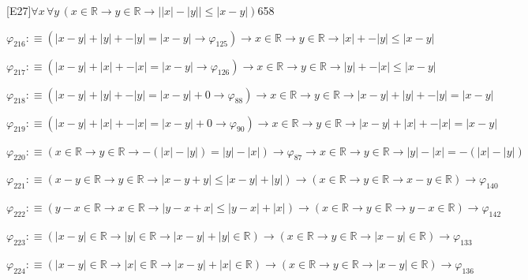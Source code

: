 \begin{fullproof}{[E27]}{$\forall x\,\forall y\,(x \in \mathbb{R} \to y \in \mathbb{R} \to \lvert \lvert x \rvert - \lvert y \rvert \rvert \leq \lvert x - y \rvert)$}{658}
\begin{abbrevlist}
\item $\varphi_{216} :\equiv (\lvert x - y \rvert + \lvert y \rvert + -\lvert y \rvert = \lvert x - y \rvert \to \varphi_{125}) \to x \in \mathbb{R} \to y \in \mathbb{R} \to \lvert x \rvert + -\lvert y \rvert \leq \lvert x - y \rvert$
\item $\varphi_{217} :\equiv (\lvert x - y \rvert + \lvert x \rvert + -\lvert x \rvert = \lvert x - y \rvert \to \varphi_{126}) \to x \in \mathbb{R} \to y \in \mathbb{R} \to \lvert y \rvert + -\lvert x \rvert \leq \lvert x - y \rvert$
\item $\varphi_{218} :\equiv (\lvert x - y \rvert + \lvert y \rvert + -\lvert y \rvert = \lvert x - y \rvert + 0 \to \varphi_{88}) \to x \in \mathbb{R} \to y \in \mathbb{R} \to \lvert x - y \rvert + \lvert y \rvert + -\lvert y \rvert = \lvert x - y \rvert$
\item $\varphi_{219} :\equiv (\lvert x - y \rvert + \lvert x \rvert + -\lvert x \rvert = \lvert x - y \rvert + 0 \to \varphi_{90}) \to x \in \mathbb{R} \to y \in \mathbb{R} \to \lvert x - y \rvert + \lvert x \rvert + -\lvert x \rvert = \lvert x - y \rvert$
\item $\varphi_{220} :\equiv (x \in \mathbb{R} \to y \in \mathbb{R} \to -(\lvert x \rvert - \lvert y \rvert) = \lvert y \rvert - \lvert x \rvert) \to \varphi_{87} \to x \in \mathbb{R} \to y \in \mathbb{R} \to \lvert y \rvert - \lvert x \rvert = -(\lvert x \rvert - \lvert y \rvert)$
\item $\varphi_{221} :\equiv (x - y \in \mathbb{R} \to y \in \mathbb{R} \to \lvert x - y + y \rvert \leq \lvert x - y \rvert + \lvert y \rvert) \to (x \in \mathbb{R} \to y \in \mathbb{R} \to x - y \in \mathbb{R}) \to \varphi_{140}$
\item $\varphi_{222} :\equiv (y - x \in \mathbb{R} \to x \in \mathbb{R} \to \lvert y - x + x \rvert \leq \lvert y - x \rvert + \lvert x \rvert) \to (x \in \mathbb{R} \to y \in \mathbb{R} \to y - x \in \mathbb{R}) \to \varphi_{142}$
\item $\varphi_{223} :\equiv (\lvert x - y \rvert \in \mathbb{R} \to \lvert y \rvert \in \mathbb{R} \to \lvert x - y \rvert + \lvert y \rvert \in \mathbb{R}) \to (x \in \mathbb{R} \to y \in \mathbb{R} \to \lvert x - y \rvert \in \mathbb{R}) \to \varphi_{133}$
\item $\varphi_{224} :\equiv (\lvert x - y \rvert \in \mathbb{R} \to \lvert x \rvert \in \mathbb{R} \to \lvert x - y \rvert + \lvert x \rvert \in \mathbb{R}) \to (x \in \mathbb{R} \to y \in \mathbb{R} \to \lvert x - y \rvert \in \mathbb{R}) \to \varphi_{136}$

\end{abbrevlist}
\end{fullproof}
